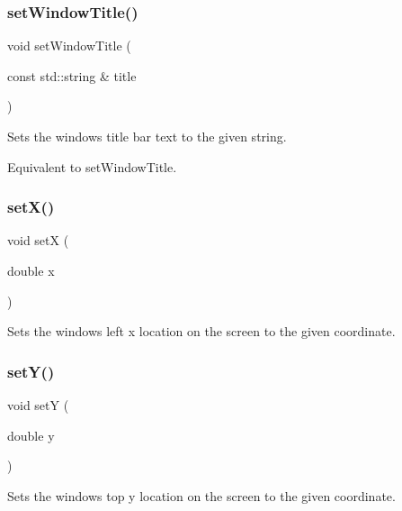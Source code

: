 \subsubsection{\texorpdfstring{set\+Window\+Title()}{setWindowTitle()}}
{\footnotesize\ttfamily void set\+Window\+Title (\begin{DoxyParamCaption}\item[{const std\+::string \&}]{title }\end{DoxyParamCaption})\hspace{0.3cm}{\ttfamily [virtual]}}



Sets the window\textquotesingle{}s title bar text to the given string. 

Equivalent to set\+Window\+Title. \mbox{\label{classGWindow_a9c18fcc579333bf9653d13ad2b372e39}} 
\subsubsection{\texorpdfstring{set\+X()}{setX()}}
{\footnotesize\ttfamily void setX (\begin{DoxyParamCaption}\item[{double}]{x }\end{DoxyParamCaption})\hspace{0.3cm}{\ttfamily [virtual]}}



Sets the window\textquotesingle{}s left x location on the screen to the given coordinate. 

\mbox{\label{classGWindow_a7d57e2a5c35d27feb58fd498a3cf82b9}} 
\subsubsection{\texorpdfstring{set\+Y()}{setY()}}
{\footnotesize\ttfamily void setY (\begin{DoxyParamCaption}\item[{double}]{y }\end{DoxyParamCaption})\hspace{0.3cm}{\ttfamily [virtual]}}



Sets the window\textquotesingle{}s top y location on the screen to the given coordinate. 

